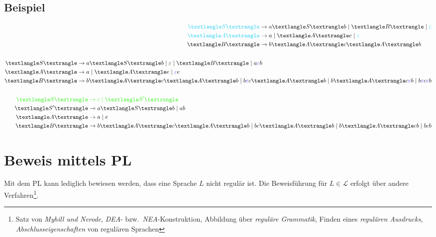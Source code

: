\documentclass[a4paper,parskip=half,footsepline,headings=normal,titlepage=false]{scrartcl}
\newcommand{\nt}[1]{\textlangle\uppercase{#1}\textrangle}
\renewcommand{\epsilon}{\varepsilon}
\begin{document}
\subsection*{Beispiel}
\begin{subequations}
	\begin{align}
		\label{eq:epsilon:1_search}
		\begin{split}
			\color{c1}\nt{S} & \to a \nt{S} b \mid \nt{B} \mid \color{c1}\epsilon \\
			\color{c1}\nt{A} & \to a \mid \nt{A}e \mid \color{c1}\epsilon \\
			\nt{B} & \to b\nt{A}c\nt{A}b
		\end{split}
		\\ \nonumber \\
		\label{eq:epsilon:2_elemination}
		\begin{split}
			\nt{S} & \to a \nt{S} b \mid \epsilon \mid \nt{B} \mid a{\color{c2}\epsilon}b \\
			\nt{A} & \to a \mid \nt{A}e \mid {\color{c2}\epsilon}e \\
			\nt{B} & \to b\nt{A}c\nt{A}b \mid b{\color{c2}\epsilon}c\nt{A}b \mid b\nt{A}c{\color{c2}\epsilon}b \mid b{\color{c2}\epsilon}c{\color{c2}\epsilon}b
		\end{split}
		\\ \nonumber \\
		\label{eq:epsilon:3_isolation}
		\begin{split}
			\color{c3}\nt{S} & \color{c3}\to \epsilon \mid \nt{S'} \\
			\nt{S'} & \to a \nt{S} b \mid ab \\
			\nt{A} & \to a \mid e \\
			\nt{B} & \to b\nt{A}c\nt{A}b \mid bc\nt{A}b \mid b\nt{A}cb \mid bcb
		\end{split}
	\end{align}
\end{subequations}

\section{Beweis mittels \acl{PL}}
Mit dem \ac{PL} kann lediglich bewiesen werden, dass eine Sprache $L$ nicht regulär ist.
Die Beweisführung für $L \in \mathcal{L}$ erfolgt über andere Verfahren\footnote{Satz von \emph{Myhill und Nerode}, \emph{\acs{DEA}}- bzw.\ \emph{\acs{NEA}}-Konstruktion, Abbildung über \emph{reguläre Grammatik}, Finden eines \emph{regulären Ausdrucks}, \emph{Abschlusseigenschaften} von regulären Sprachen}.
\end{document}
